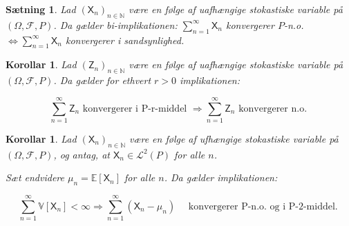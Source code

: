 \documentclass{article}
\newcommand{\1}{\mathbbm{1}}
\newcommand{\X}{\mathsf{X}}
\theoremstyle{boxed}
\newtheorem{corollary}[theorem]{Korollar}
\newtheorem{proposition}[theorem]{Sætning}
\begin{document}
\begin{theorem-box}
    \begin{proposition}
        Lad $\left(\mathsf{X}_n\right)_{n \in \mathbb{N}}$ være en følge af uafhængige stokastiske variable på $(\Omega, \mathcal{F}, P)$.
Da gælder bi-implikationen:
$\sum_{n=1}^{\infty} \mathsf{X}_n$ konvergerer $P$-n.o. $\Longleftrightarrow \sum_{n=1}^{\infty} \mathsf{X}_n$ konvergerer i sandsynlighed.
    \end{proposition}
\end{theorem-box}
\begin{theorem-box}
    \begin{corollary}
        Lad $\left(\mathsf{Z}_n\right)_{n \in \mathbb{N}}$ være en følge af uafhængige stokastiske variable på $(\Omega, \mathcal{F}, P)$.
Da gælder for ethvert $r>0$ implikationen:

$$
\sum_{n=1}^{\infty} \mathsf{Z}_n \text { konvergerer i P-r-middel } \Longrightarrow \sum_{n=1}^{\infty} \mathsf{Z}_n \text { konvergerer n.o. }
$$

    \end{corollary}
\end{theorem-box}
\begin{theorem-box}
    \begin{corollary}
        Lad $\left(\mathsf{X}_n\right)_{n \in \mathbb{N}}$ være en følge af ufhængige stokastiske variable på $(\Omega, \mathcal{F}, P)$, og antag, at $\mathsf{X}_n \in \mathcal{L}^2(P)$ for alle $n$.

Sæt endvidere $\mu_n=\mathbb{E}\left[\mathsf{X}_n\right]$ for alle $n$.
Da gælder implikationen:

$$
\sum_{n=1}^{\infty} \mathbb{V}\left[\mathsf{X}_n\right]<\infty \Longrightarrow \sum_{n=1}^{\infty}\left(\X_n-\mu_n\right) \quad \text { konvergerer P-n.o. og i P-2-middel. }
$$

    \end{corollary}
\end{theorem-box}
\end{document}
